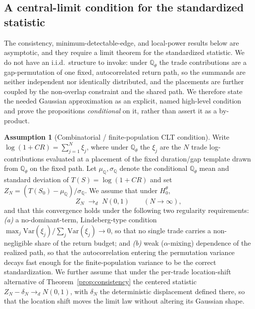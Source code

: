 \documentclass[preprint,12pt]{elsarticle}
\theoremstyle{definition}
\newtheorem{assumption}{Assumption}
\begin{document}
\subsection{A central-limit condition for the standardized statistic}
\label{sec:clt-assumption}

The consistency, minimum-detectable-edge, and local-power results below are
asymptotic, and they require a limit theorem for the standardized statistic. We
do not have an i.i.d.\ structure to invoke: under $\mathbb{Q}_\theta$ the trade
contributions are a gap-permutation of one fixed, autocorrelated return path, so
the summands are neither independent nor identically distributed, and the
placements are further coupled by the non-overlap constraint and the shared path.
We therefore state the needed Gaussian approximation as an explicit, named
high-level condition and prove the propositions \emph{conditional} on it, rather
than assert it as a by-product.

\begin{assumption}[Combinatorial / finite-population CLT condition]
\label{ass:clt}
Write $\log(1+CR)=\sum_{j=1}^{N}\xi_j$, where under $\mathbb{Q}_\theta$ the $\xi_j$
are the $N$ trade log-contributions evaluated at a placement of the fixed
duration/gap template drawn from $\mathbb{Q}_\theta$ on the fixed path. Let
$\mu_{\mathbb Q},\sigma_{\mathbb Q}$ denote the conditional $\mathbb{Q}_\theta$
mean and standard deviation of $T(S)=\log(1+CR)$ and set
$Z_N=(T(S_0)-\mu_{\mathbb Q})/\sigma_{\mathbb Q}$. We assume that under
$H_0^\theta$,
\[
Z_N \;\to_d\; N(0,1) \qquad (N\to\infty),
\]
and that this convergence holds under the following two regularity requirements:
\emph{(a)} a no-dominant-term, Lindeberg-type condition
$\max_{j}\mathrm{Var}(\xi_j)/\allowbreak\sum_{j}\mathrm{Var}(\xi_j)\to0$, so that no
single trade carries a non-negligible share of the return budget; and
\emph{(b)} weak ($\alpha$-mixing) dependence of the realized path, so that the
autocorrelation entering the permutation variance decays fast enough for the
finite-population variance to be the correct standardization. We further assume
that under the per-trade location-shift alternative of
Theorem~\ref{prop:consistency} the centered statistic $Z_N-\delta_N\to_d N(0,1)$,
with $\delta_N$ the deterministic displacement defined there, so that the
location shift moves the limit law without altering its Gaussian shape.
\end{assumption}
\end{document}
